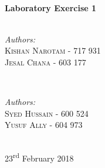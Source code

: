 \documentclass[10pt, conference]{IEEEtran}
\begin{document}
\begin{titlepage}

\HRule \\[0.4cm]
{ \huge \bfseries Laboratory Exercise 1}\\[0.4cm] %
\HRule \\[1.5cm]
 

\begin{minipage}{0.4\textwidth}
\begin{flushleft} \large
	\emph{Authors:}\\
	\textsc{Kishan Narotam - 717 931\\Jesal Chana - 603 177} 
\end{flushleft}
\end{minipage}
~
\begin{minipage}{0.4\textwidth}
\begin{flushright} \large
	\emph{Authors:} \\
	\textsc{Syed Hussain - 600 524\\Yusuf Ally - 604 973} 
\end{flushright}
\end{minipage}\\[2cm]



{\large 23\textsuperscript{rd} February 2018}\\[2cm] %


\vfill %

\end{titlepage}

\end{document}
